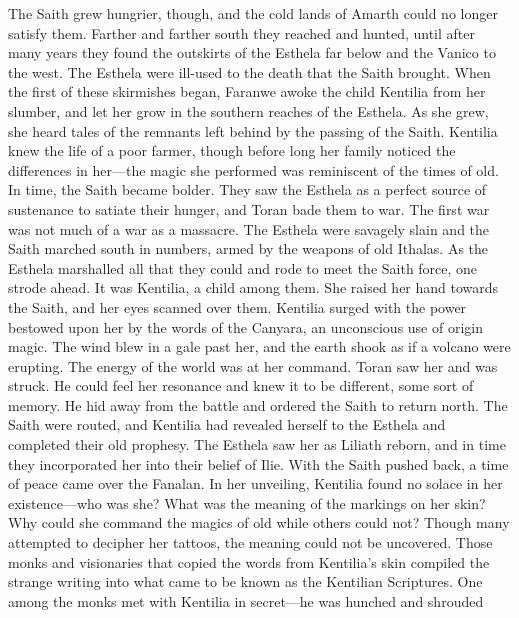 \documentclass[smalldemyvopaper,11pt,twoside,onecolumn,openright,extrafontsizes]{memoir}
\begin{document}
The Saith grew hungrier, though, and the cold lands of Amarth could no longer satisfy them. Farther and farther south they reached and hunted, until after many years they found the outskirts of the Esthela far below and the Vanico to the west. The Esthela were ill-used to the death that the Saith brought. When the first of these skirmishes began, Faranwe awoke the child Kentilia from her slumber, and let her grow in the southern reaches of the Esthela. As she grew, she heard tales of the remnants left behind by the passing of the Saith. Kentilia knew the life of a poor farmer, though before long her family noticed the differences in her—the magic she performed was reminiscent of the times of old. In time, the Saith became bolder. They saw the Esthela as a perfect source of sustenance to satiate their hunger, and Toran bade them to war. The first war was not much of a war as a massacre. The Esthela were savagely slain and the Saith marched south in numbers, armed by the weapons of old Ithalas. As the Esthela marshalled all that they could and rode to meet the Saith force, one strode ahead. It was Kentilia, a child among them. She raised her hand towards the Saith, and her eyes scanned over them. Kentilia surged with the power bestowed upon her by the words of the Canyara, an unconscious use of origin magic. The wind blew in a gale past her, and the earth shook as if a volcano were erupting. The energy of the world was at her command. Toran saw her and was struck. He could feel her resonance and knew it to be different, some sort of memory. He hid away from the battle and ordered the Saith to return north. The Saith were routed, and Kentilia had revealed herself to the Esthela and completed their old prophesy. The Esthela saw her as Liliath reborn, and in time they incorporated her into their belief of Ilie. With the Saith pushed back, a time of peace came over the Fanalan. In her unveiling, Kentilia found no solace in her existence—who was she? What was the meaning of the markings on her skin? Why could she command the magics of old while others could not?
	Though many attempted to decipher her tattoos, the meaning could not be uncovered. Those monks and visionaries that copied the words from Kentilia’s skin compiled the strange writing into what came to be known as the Kentilian Scriptures. One among the monks met with Kentilia in secret—he was hunched and shrouded
\end{document}
